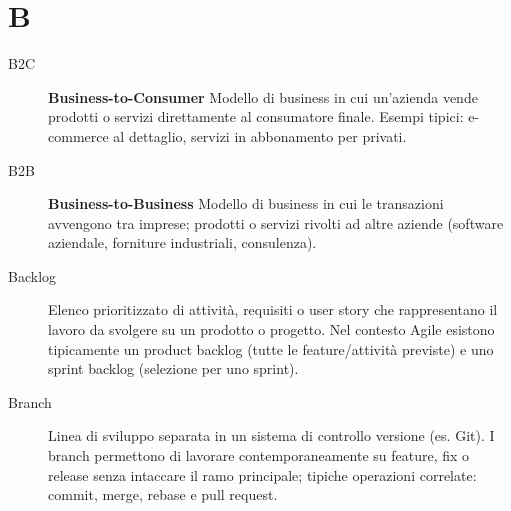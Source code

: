 \section*{B}
\begin{description}
    \item[B2C] \textbf{Business-to-Consumer} Modello di business in cui un'azienda vende prodotti o servizi direttamente al consumatore finale. Esempi tipici: e-commerce al dettaglio, servizi in abbonamento per privati.
    \item[B2B] \textbf{Business-to-Business} Modello di business in cui le transazioni avvengono tra imprese; prodotti o servizi rivolti ad altre aziende (software aziendale, forniture industriali, consulenza).
    \item[Backlog] Elenco prioritizzato di attività, requisiti o user story che rappresentano il lavoro da svolgere su un prodotto o progetto. Nel contesto Agile esistono tipicamente un product backlog (tutte le feature/attività previste) e uno sprint backlog (selezione per uno sprint).
    \item[Branch] Linea di sviluppo separata in un sistema di controllo versione (es. Git). I branch permettono di lavorare contemporaneamente su feature, fix o release senza intaccare il ramo principale; tipiche operazioni correlate: commit, merge, rebase e pull request.
\end{description}

